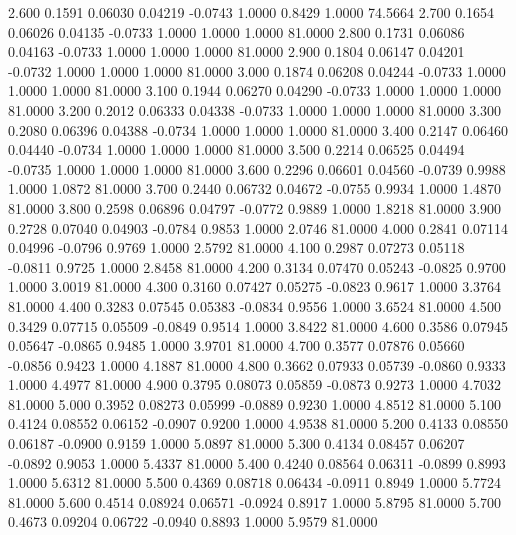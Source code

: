    2.600   0.1591   0.06030   0.04219  -0.0743   1.0000   0.8429   1.0000  74.5664
   2.700   0.1654   0.06026   0.04135  -0.0733   1.0000   1.0000   1.0000  81.0000
   2.800   0.1731   0.06086   0.04163  -0.0733   1.0000   1.0000   1.0000  81.0000
   2.900   0.1804   0.06147   0.04201  -0.0732   1.0000   1.0000   1.0000  81.0000
   3.000   0.1874   0.06208   0.04244  -0.0733   1.0000   1.0000   1.0000  81.0000
   3.100   0.1944   0.06270   0.04290  -0.0733   1.0000   1.0000   1.0000  81.0000
   3.200   0.2012   0.06333   0.04338  -0.0733   1.0000   1.0000   1.0000  81.0000
   3.300   0.2080   0.06396   0.04388  -0.0734   1.0000   1.0000   1.0000  81.0000
   3.400   0.2147   0.06460   0.04440  -0.0734   1.0000   1.0000   1.0000  81.0000
   3.500   0.2214   0.06525   0.04494  -0.0735   1.0000   1.0000   1.0000  81.0000
   3.600   0.2296   0.06601   0.04560  -0.0739   0.9988   1.0000   1.0872  81.0000
   3.700   0.2440   0.06732   0.04672  -0.0755   0.9934   1.0000   1.4870  81.0000
   3.800   0.2598   0.06896   0.04797  -0.0772   0.9889   1.0000   1.8218  81.0000
   3.900   0.2728   0.07040   0.04903  -0.0784   0.9853   1.0000   2.0746  81.0000
   4.000   0.2841   0.07114   0.04996  -0.0796   0.9769   1.0000   2.5792  81.0000
   4.100   0.2987   0.07273   0.05118  -0.0811   0.9725   1.0000   2.8458  81.0000
   4.200   0.3134   0.07470   0.05243  -0.0825   0.9700   1.0000   3.0019  81.0000
   4.300   0.3160   0.07427   0.05275  -0.0823   0.9617   1.0000   3.3764  81.0000
   4.400   0.3283   0.07545   0.05383  -0.0834   0.9556   1.0000   3.6524  81.0000
   4.500   0.3429   0.07715   0.05509  -0.0849   0.9514   1.0000   3.8422  81.0000
   4.600   0.3586   0.07945   0.05647  -0.0865   0.9485   1.0000   3.9701  81.0000
   4.700   0.3577   0.07876   0.05660  -0.0856   0.9423   1.0000   4.1887  81.0000
   4.800   0.3662   0.07933   0.05739  -0.0860   0.9333   1.0000   4.4977  81.0000
   4.900   0.3795   0.08073   0.05859  -0.0873   0.9273   1.0000   4.7032  81.0000
   5.000   0.3952   0.08273   0.05999  -0.0889   0.9230   1.0000   4.8512  81.0000
   5.100   0.4124   0.08552   0.06152  -0.0907   0.9200   1.0000   4.9538  81.0000
   5.200   0.4133   0.08550   0.06187  -0.0900   0.9159   1.0000   5.0897  81.0000
   5.300   0.4134   0.08457   0.06207  -0.0892   0.9053   1.0000   5.4337  81.0000
   5.400   0.4240   0.08564   0.06311  -0.0899   0.8993   1.0000   5.6312  81.0000
   5.500   0.4369   0.08718   0.06434  -0.0911   0.8949   1.0000   5.7724  81.0000
   5.600   0.4514   0.08924   0.06571  -0.0924   0.8917   1.0000   5.8795  81.0000
   5.700   0.4673   0.09204   0.06722  -0.0940   0.8893   1.0000   5.9579  81.0000
